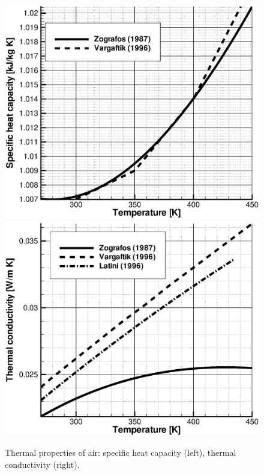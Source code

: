 \begin{figure}[htb!]
\includegraphics[scale=0.3]{PART_II/G/heat_capacity_air.eps}\includegraphics[scale=0.3]{PART_II/G/heat_conductivity_air.eps}
\caption{Thermal properties of air: specific heat capacity (left), thermal conductivity (right).}
\label{fig:thermal_properties}
\end{figure}